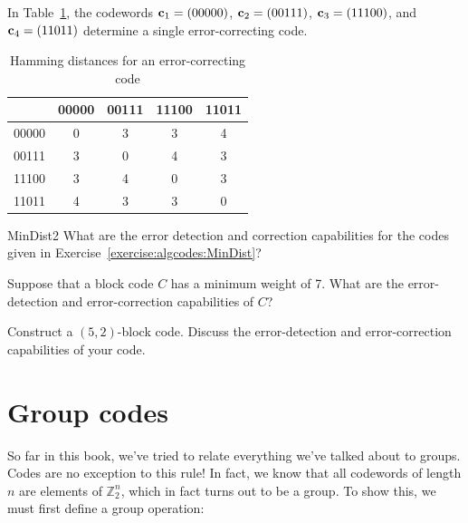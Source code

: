  \begin{example}{}
In Table~\ref{algcodes:table2}, the codewords ${\bold c}_1 = (00000)$, ${\bold c}_2 = (00111)$,
${\bold c}_3 = (11100)$, and ${\bold c}_4 = (11011)$ determine a
single error-correcting code.  
\end{example}
  
\begin{table}[htb]
\caption{ Hamming distances for an error-correcting code\label{algcodes:table2}}{\small
\begin{center}
\begin{tabular}{|c|cccc|}
\hline
      & 00000 & 00111 & 11100 & 11011 \\ \hline
00000 & 0     & 3     & 3     & 4 \\
00111 & 3     & 0     & 4     & 3 \\
11100 & 3     & 4     & 0     & 3 \\
11011 & 4     & 3     & 3     & 0 \\
\hline
\end{tabular}
\end{center}
}
\end{table}
 
 \begin{exercise}{MinDist2}
What are the error detection and correction capabilities for the codes given in Exercise~\ref{exercise:algcodes:MinDist}? 
\end{exercise} 
 
\begin{exercise}{}
Suppose that a  block code $C$ has a minimum weight of 7. What are the
error-detection and error-correction capabilities of $C$?
\end{exercise}
 
 \begin{exercise}{}
Construct a $(5,2)$-block code. Discuss the error-detection and
error-correction capabilities of your code.
 \end{exercise}
 
\section{Group codes\quad
{}}

So far in this book, we've tried to relate everything we've talked about to groups. Codes are no exception to this rule!  In fact, we know that all codewords of length $n$ are elements of $\mathbb{Z}_2^n$, which in fact turns out to be a group. To show this, we must first define a group operation:

